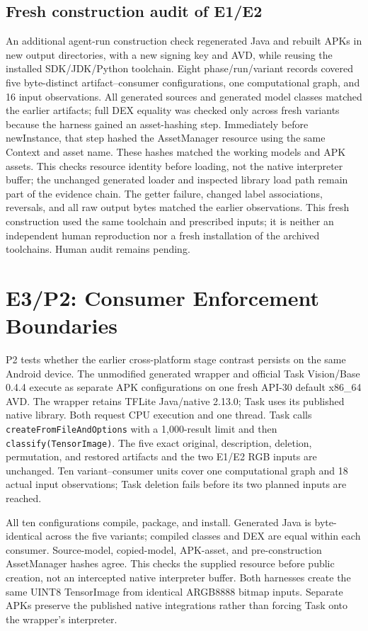 \documentclass[10pt,twocolumn,letterpaper]{article}
\newcommand{\code}[1]{\texttt{#1}}
\begin{document}
\subsection{Fresh construction audit of E1/E2}
\label{sec:rebuild}
An additional agent-run construction check regenerated Java and rebuilt APKs in new output directories, with a new signing key and AVD, while reusing the installed SDK/JDK/Python toolchain. Eight phase/run/variant records covered five byte-distinct artifact--consumer configurations, one computational graph, and 16 input observations. All generated sources and generated model classes matched the earlier artifacts; full DEX equality was checked only across fresh variants because the harness gained an asset-hashing step. Immediately before newInstance, that step hashed the AssetManager resource using the same Context and asset name. These hashes matched the working models and APK assets. This checks resource identity before loading, not the native interpreter buffer; the unchanged generated loader and inspected library load path remain part of the evidence chain. The getter failure, changed label associations, reversals, and all raw output bytes matched the earlier observations. This fresh construction used the same toolchain and prescribed inputs; it is neither an independent human reproduction nor a fresh installation of the archived toolchains. Human audit remains pending.

\section{E3/P2: Consumer Enforcement Boundaries}
\label{sec:e3}
P2 tests whether the earlier cross-platform stage contrast persists on the same Android device. The unmodified generated wrapper and official Task Vision/Base 0.4.4 execute as separate APK configurations on one fresh API-30 default x86\_64 AVD. The wrapper retains TFLite Java/native 2.13.0; Task uses its published native library. Both request CPU execution and one thread. Task calls \code{createFromFileAndOptions} with a 1,000-result limit and then \code{classify(TensorImage)}. The five exact original, description, deletion, permutation, and restored artifacts and the two E1/E2 RGB inputs are unchanged. Ten variant--consumer units cover one computational graph and 18 actual input observations; Task deletion fails before its two planned inputs are reached.

All ten configurations compile, package, and install. Generated Java is byte-identical across the five variants; compiled classes and DEX are equal within each consumer. Source-model, copied-model, APK-asset, and pre-construction AssetManager hashes agree. This checks the supplied resource before public creation, not an intercepted native interpreter buffer. Both harnesses create the same UINT8 TensorImage from identical ARGB8888 bitmap inputs. Separate APKs preserve the published native integrations rather than forcing Task onto the wrapper's interpreter.
\end{document}
